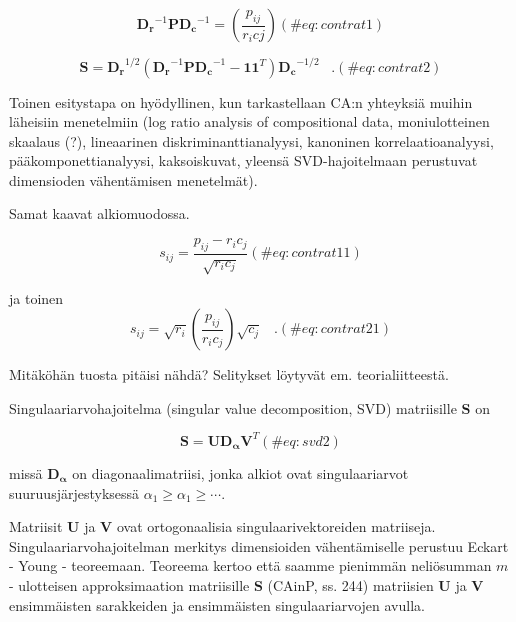 \documentclass[
  finnish,
]{book}
\begin{document}
\begin{equation}
\boldsymbol{D_r}^{-1} \boldsymbol{P} \boldsymbol{D_c}^{-1} = \left( \frac{p_{ij}} {r_{i} c{j}} \right)
(\#eq:contrat1)
\end{equation}

\begin{equation}
\boldsymbol{S} = \boldsymbol{D_r}^{1/2} (\boldsymbol{D_r}^{-1} \boldsymbol{P} \boldsymbol{D_c}^{-1} - \boldsymbol{1}\boldsymbol{1}^{T} ) \boldsymbol{D_c}^{-1/2}  \;\;\; .
(\#eq:contrat2)
\end{equation}

Toinen esitystapa on hyödyllinen, kun tarkastellaan CA:n yhteyksiä
muihin läheisiin menetelmiin (log ratio analysis of compositional data,
moniulotteinen skaalaus (?), lineaarinen diskriminanttianalyysi,
kanoninen korrelaatioanalyysi, pääkomponettianalyysi, kaksoiskuvat,
yleensä SVD-hajoitelmaan perustuvat dimensioden vähentämisen
menetelmät).

Samat kaavat alkiomuodossa.

\begin{equation}
s_{ij} = \frac{p_{ij}-r_{i}c_{j}} { \sqrt{r_{i}c_{j} } }
(\#eq:contrat11)
\end{equation}

ja toinen \begin{equation}
s_{ij} = \sqrt{r_{i}} \left( \frac{p_{ij}}{r_{i}c_{j}} \right) \sqrt{c_{j}} \;\;\; .
(\#eq:contrat21)
\end{equation}

Mitäköhän tuosta pitäisi nähdä? Selitykset löytyvät em.
teorialiitteestä.

Singulaariarvohajoitelma (singular value decomposition, SVD) matriisille
\(\boldsymbol{S}\) on

\begin{equation}
\boldsymbol{S} = \boldsymbol{U} \boldsymbol{D_{\alpha}} \boldsymbol{V}^{T}
(\#eq:svd2)
\end{equation}

missä \(\boldsymbol{D_{\alpha}}\) on diagonaalimatriisi, jonka alkiot
ovat singulaariarvot suuruusjärjestyksessä
\(\alpha_{1}\geq \alpha_{1} \geq \cdots\).

Matriisit \(\boldsymbol{U}\) ja \(\boldsymbol{V}\) ovat ortogonaalisia
singulaarivektoreiden matriiseja. Singulaariarvohajoitelman merkitys
dimensioiden vähentämiselle perustuu Eckart - Young - teoreemaan.
Teoreema kertoo että saamme pienimmän neliösumman \(m\) - ulotteisen
approksimaation matriisille \(\boldsymbol{S}\) (CAinP, ss. 244)
matriisien \(\boldsymbol{U}\) ja \(\boldsymbol{V}\) ensimmäisten
sarakkeiden ja ensimmäisten singulaariarvojen avulla.
\end{document}
